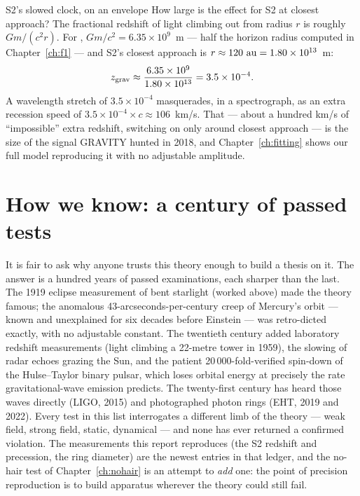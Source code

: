 \begin{worked}{S2's slowed clock, on an envelope}
How large is the effect for S2 at closest approach? The fractional
redshift of light climbing out from radius $r$ is roughly $Gm/(c^2 r)$.
For \sgra{}, $Gm/c^2 = 6.35\times10^{9}$~m — half the horizon radius
computed in Chapter~\ref{ch:f1} — and S2's closest approach is
$r \approx 120~{\rm au} = 1.80\times10^{13}$~m:
\[
z_{\rm grav} \approx \frac{6.35\times10^{9}}{1.80\times10^{13}}
= 3.5\times10^{-4}.
\]
A wavelength stretch of $3.5\times10^{-4}$ masquerades, in a
spectrograph, as an extra recession speed of
$3.5\times10^{-4}\times c \approx 106$~km/s. That — about a hundred
km/s of ``impossible'' extra redshift, switching on only around closest
approach — is the size of the signal GRAVITY hunted in 2018, and
Chapter~\ref{ch:fitting} shows our full model reproducing it with no
adjustable amplitude.
\end{worked}

\section{How we know: a century of passed tests}

It is fair to ask why anyone trusts this theory enough to build a
thesis on it. The answer is a hundred years of passed examinations,
each sharper than the last. The 1919 eclipse measurement of bent
starlight (worked above) made the theory famous; the anomalous
43-arcseconds-per-century creep of Mercury's orbit — known and
unexplained for six decades before Einstein — was retro-dicted
exactly, with no adjustable constant. The twentieth century added
laboratory redshift measurements (light climbing a 22-metre tower in
1959), the slowing of radar echoes grazing the Sun, and the patient
20\,000-fold-verified spin-down of the Hulse--Taylor binary pulsar,
which loses orbital energy at precisely the rate gravitational-wave
emission predicts. The twenty-first century has heard those waves
directly (LIGO, 2015) and photographed photon rings (EHT, 2019 and
2022). Every test in this list interrogates a different limb of the
theory — weak field, strong field, static, dynamical — and none has
ever returned a confirmed violation. The measurements this report
reproduces (the S2 redshift and precession, the ring diameter) are
the newest entries in that ledger, and the no-hair test of
Chapter~\ref{ch:nohair} is an attempt to \emph{add} one: the point of
precision reproduction is to build apparatus wherever the theory
could still fail.


